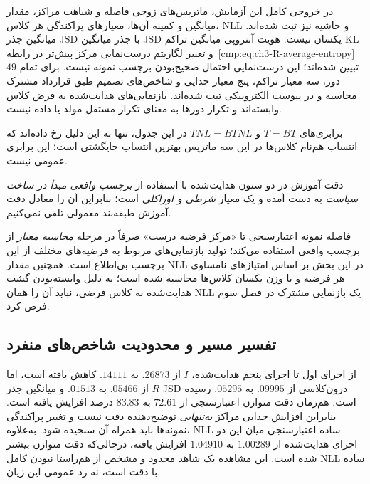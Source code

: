 در خروجی کامل این آزمایش،
ماتریس‌های زوجی فاصله و شباهت مراکز،
مقدار میانگین و کمینه آن‌ها،
معیارهای پراکندگی هر کلاس، NLL و
حاشیه نیز ثبت شده‌اند.
میانگین جذر JSD با جذر میانگین JSD
یکسان نیست. هویت آنتروپی میانگین
تراکم KL و تعبیر لگاریتم درست‌نمایی
مرکز پیش‌تر در
رابطه~\eqref{cmp:eq:ch3-R-average-entropy}
تبیین شده‌اند؛ این درست‌نمایی
احتمال صحیح‌بودن برچسب نمونه نیست.
برای تمام $49$ دور، سه معیار تراکم، پنج معیار جدایی و شاخص‌های تصمیم طبق قرارداد مشترک محاسبه و در پیوست الکترونیکی ثبت شده‌اند. بازنمایی‌های هدایت‌شده به فرض کلاس وابسته‌اند و تکرار دورها به معنای تکرار مستقل مولد یا داده نیست.


برابری‌های $T=BT$ و $TNL=BTNL$ در این جدول، تنها به این دلیل رخ داده‌اند که انتساب هم‌نام کلاس‌ها در این سه ماتریس بهترین انتساب جایگشتی است؛ این برابری عمومی نیست.


دقت آموزش در دو ستون هدایت‌شده با استفاده از \emph{برچسب واقعی مبدأ در ساخت سیاست} به دست آمده و یک معیار \emph{شرطی و اوراکلی} است؛ بنابراین آن را معادل دقت آموزش طبقه‌بند معمولی تلقی نمی‌کنیم.


فاصله نمونه اعتبارسنجی تا «مرکز فرضیه درست» صرفاً در مرحله \emph{محاسبه معیار} از برچسب واقعی استفاده می‌کند؛ تولید بازنمایی‌های مربوط به فرضیه‌های مختلف از این برچسب بی‌اطلاع است. همچنین مقدار NLL در این بخش بر اساس امتیازهای نامساوی هر فرضیه و با وزن یکسان کلاس‌ها محاسبه شده است؛ به دلیل وابسته‌بودن گشت هدایت‌شده به کلاس فرضی، نباید آن را همان NLL یک بازنمایی مشترک در فصل سوم فرض کرد.

\subsection{تفسیر مسیر و محدودیت شاخص‌های منفرد}
\label{subsec:ch4-center-observation-interpretation}
از اجرای اول تا اجرای پنجم هدایت‌شده، $I$ از $.26873$ به $.14111$ کاهش یافته است، اما $R$ از $.05466$ به $.01513$ و میانگین جذر JSD درون‌کلاسی از $.09995$ به $.05295$ رسیده است. هم‌زمان دقت متوازن اعتبارسنجی از $72.61$ به $83.83$ درصد افزایش یافته است. بنابراین افزایش جدایی مراکز \emph{به‌تنهایی} توضیح‌دهنده دقت نیست و تغییر پراکندگی نمونه‌ها باید همراه آن سنجیده شود. به‌علاوه، NLL ساده اعتبارسنجی میان این دو اجرای هدایت‌شده از $1.00289$ به $1.04910$ افزایش یافته، درحالی‌که دقت متوازن بیشتر شده است. این مشاهده یک شاهد محدود و مشخص از هم‌راستا نبودن کامل NLL ساده با دقت است، نه رد عمومی این زیان.

